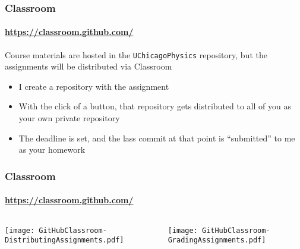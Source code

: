 \documentclass[hyperref={colorlinks=true}]{beamer}
\begin{document}
\begin{frame}%
  \frametitle{\github Classroom}
  \framesubtitle{\url{https://classroom.github.com/}}
  
  Course materials are hosted in the \github \texttt{UChicagoPhysics} repository, but the assignments will be distributed via \github Classroom
  
  \begin{itemize}
    \item I create a repository with the assignment
    \item With the click of a button, that repository gets distributed to all of you as your own private repository
    \item The deadline is set, and the lass commit at that point is ``submitted'' to me as your homework 
  \end{itemize}
  
  
\end{frame}


\begin{frame}%
  \frametitle{\github Classroom}
  \framesubtitle{\url{https://classroom.github.com/}}
  
    \begin{columns}
  
    
      \texttt{[image: GitHubClassroom-DistributingAssignments.pdf]}
    
    \pause
    
    
      \texttt{[image: GitHubClassroom-GradingAssignments.pdf]}
  
  \end{columns}
  
  
  \vspace{0.2cm}
  
  \centering {}
  
\end{frame}


\end{document}

